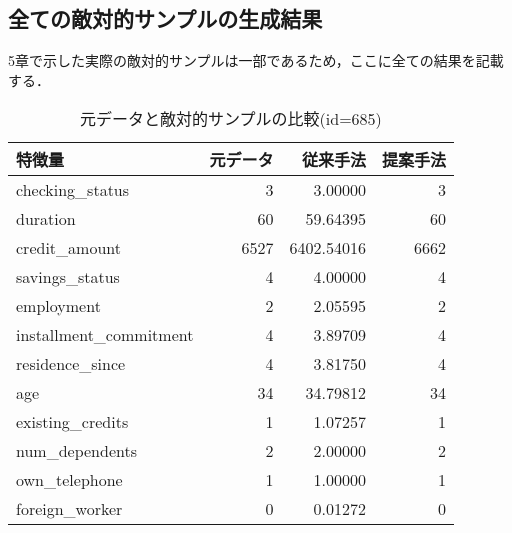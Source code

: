 \subsection*{全ての敵対的サンプルの生成結果}
5章で示した実際の敵対的サンプルは一部であるため，ここに全ての結果を記載する．

\begin{table}[H]
    \centering
    \caption{元データと敵対的サンプルの比較(id=685)}
    \begin{tabular}{|l|r|r|r|} \hline
        特徴量 & 元データ & 従来手法 & 提案手法 \\ \hline
        checking\_status & 3 & 3.00000 & 3 \\ \hline
        duration & 60 & 59.64395 & 60 \\ \hline
        credit\_amount & 6527 & 6402.54016 & 6662 \\ \hline
        savings\_status & 4 & 4.00000 & 4 \\ \hline
        employment & 2 & 2.05595 & 2 \\ \hline
        installment\_commitment & 4 & 3.89709 & 4 \\ \hline
        residence\_since & 4 & 3.81750 & 4 \\ \hline
        age & 34 & 34.79812 & 34 \\ \hline
        existing\_credits & 1 & 1.07257 & 1 \\ \hline
        num\_dependents & 2 & 2.00000 & 2 \\ \hline
        own\_telephone & 1 & 1.00000 & 1 \\ \hline
        foreign\_worker & 0 & 0.01272 & 0 \\ \hline
    \end{tabular}
\end{table}

